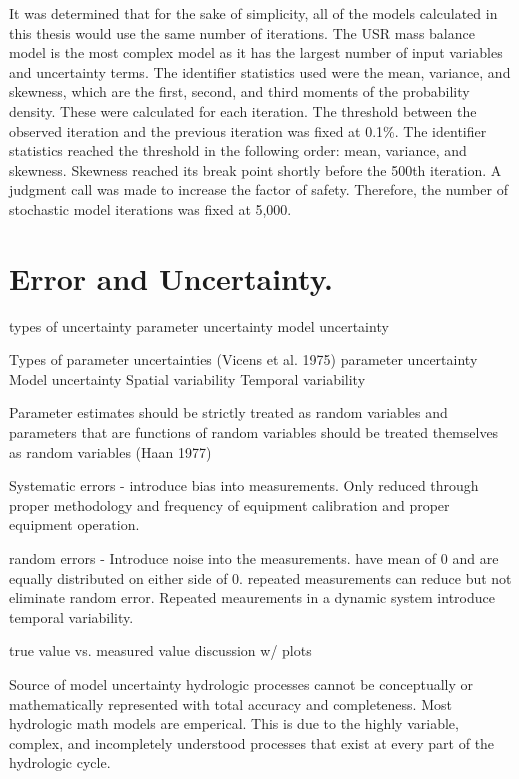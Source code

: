 \begin{linenumbers}
It was determined that for the sake of simplicity, all of the models calculated in this thesis would use the same number of iterations.  The USR mass balance model is the most complex model as it has the largest number of input variables and uncertainty terms.  The identifier statistics used were the mean, variance, and skewness, which are the first, second, and third moments of the probability density.  These were calculated for each iteration.  The threshold between the observed iteration and the previous iteration was fixed at 0.1\%.  The identifier statistics reached the threshold in the following order: mean, variance, and skewness.  Skewness reached its break point shortly before the 500th iteration.  A judgment call was made to increase the factor of safety.  Therefore, the number of stochastic model iterations was fixed at 5,000.  

\section{Error and Uncertainty.}
\label{sec:ErrorAndUncertainty}

types of uncertainty
	parameter uncertainty
	model uncertainty

Types of parameter uncertainties (Vicens et al. 1975)
	parameter uncertainty
	Model uncertainty
	Spatial variability
	Temporal variability
	
Parameter estimates should be strictly treated as random variables and parameters that are functions of random variables should be treated themselves as random variables (Haan 1977)
	
	Systematic errors - introduce bias into measurements.  Only reduced through proper methodology and frequency of equipment calibration and proper equipment operation.
	
	random errors - Introduce noise into the measurements.  have mean of 0 and are equally distributed on either side of 0.  repeated measurements can reduce but not eliminate random error.  Repeated meaurements in a dynamic system introduce temporal variability.
	
	true value vs. measured value discussion w/ plots

Source of model uncertainty
	hydrologic processes cannot be conceptually or mathematically represented with total accuracy and completeness.  Most hydrologic math models are emperical.  This is due to the highly variable, complex, and incompletely understood processes that exist at every part of the hydrologic cycle.
	

\end{linenumbers}
